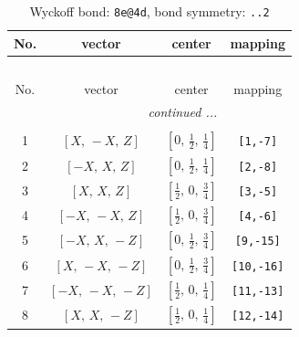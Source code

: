 \documentclass[fleqn,8pt]{jsarticle}
\begin{document}
\begin{longtable}{cccc}
\caption{Wyckoff bond: {\tt 8e@4d}, bond symmetry: {\tt ..2}}
 \\
 \hline \hline
No. & vector & center & mapping \\ \hline \endfirsthead

\multicolumn{3}{l}{\tablename\ \thetable{}} \\
 \hline \hline
No. & vector & center & mapping \\ \hline \endhead

 \hline \hline
\multicolumn{3}{r}{\footnotesize\it continued ...} \\ \endfoot

 \hline \hline
\multicolumn{3}{r}{} \\ \endlastfoot

1 & $\left[ X,\, - X,\, Z \right]$ & $\left[ 0,\, \frac{1}{2},\, \frac{1}{4} \right]$ & {\tt [1,-7]} \\ \hline
2 & $\left[ - X,\, X,\, Z \right]$ & $\left[ 0,\, \frac{1}{2},\, \frac{1}{4} \right]$ & {\tt [2,-8]} \\ \hline
3 & $\left[ X,\, X,\, Z \right]$ & $\left[ \frac{1}{2},\, 0,\, \frac{3}{4} \right]$ & {\tt [3,-5]} \\ \hline
4 & $\left[ - X,\, - X,\, Z \right]$ & $\left[ \frac{1}{2},\, 0,\, \frac{3}{4} \right]$ & {\tt [4,-6]} \\ \hline
5 & $\left[ - X,\, X,\, - Z \right]$ & $\left[ 0,\, \frac{1}{2},\, \frac{3}{4} \right]$ & {\tt [9,-15]} \\ \hline
6 & $\left[ X,\, - X,\, - Z \right]$ & $\left[ 0,\, \frac{1}{2},\, \frac{3}{4} \right]$ & {\tt [10,-16]} \\ \hline
7 & $\left[ - X,\, - X,\, - Z \right]$ & $\left[ \frac{1}{2},\, 0,\, \frac{1}{4} \right]$ & {\tt [11,-13]} \\ \hline
8 & $\left[ X,\, X,\, - Z \right]$ & $\left[ \frac{1}{2},\, 0,\, \frac{1}{4} \right]$ & {\tt [12,-14]} \\
\end{longtable}
\renewcommand{\arraystretch}{1.2}
\end{document}
